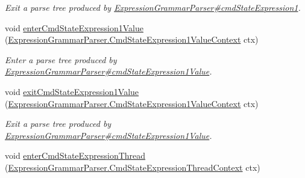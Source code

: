 \begin{DoxyCompactItemize}
\begin{DoxyCompactList}\small\item\em Exit a parse tree produced by \hyperlink{classgov_1_1nasa_1_1jpf_1_1inspector_1_1server_1_1expression_1_1parser_1_1_expression_grammar_parser_a1497794a3a59d8319803998a35dbb16e}{Expression\+Grammar\+Parser\#cmd\+State\+Expression1}. \end{DoxyCompactList}\item 
void \hyperlink{interfacegov_1_1nasa_1_1jpf_1_1inspector_1_1server_1_1expression_1_1parser_1_1_expression_grammar_listener_ae372522f6acd473c9201911f85256358}{enter\+Cmd\+State\+Expression1\+Value} (\hyperlink{classgov_1_1nasa_1_1jpf_1_1inspector_1_1server_1_1expression_1_1parser_1_1_expression_grammar_paacaa2424bb30d5b61478a2ac87dd697e}{Expression\+Grammar\+Parser.\+Cmd\+State\+Expression1\+Value\+Context} ctx)
\begin{DoxyCompactList}\small\item\em Enter a parse tree produced by \hyperlink{classgov_1_1nasa_1_1jpf_1_1inspector_1_1server_1_1expression_1_1parser_1_1_expression_grammar_parser_a3251ad238ec49a426731c88fd13886b1}{Expression\+Grammar\+Parser\#cmd\+State\+Expression1\+Value}. \end{DoxyCompactList}\item 
void \hyperlink{interfacegov_1_1nasa_1_1jpf_1_1inspector_1_1server_1_1expression_1_1parser_1_1_expression_grammar_listener_a8a57cc01401c52e1ef9a1432ba47031c}{exit\+Cmd\+State\+Expression1\+Value} (\hyperlink{classgov_1_1nasa_1_1jpf_1_1inspector_1_1server_1_1expression_1_1parser_1_1_expression_grammar_paacaa2424bb30d5b61478a2ac87dd697e}{Expression\+Grammar\+Parser.\+Cmd\+State\+Expression1\+Value\+Context} ctx)
\begin{DoxyCompactList}\small\item\em Exit a parse tree produced by \hyperlink{classgov_1_1nasa_1_1jpf_1_1inspector_1_1server_1_1expression_1_1parser_1_1_expression_grammar_parser_a3251ad238ec49a426731c88fd13886b1}{Expression\+Grammar\+Parser\#cmd\+State\+Expression1\+Value}. \end{DoxyCompactList}\item 
void \hyperlink{interfacegov_1_1nasa_1_1jpf_1_1inspector_1_1server_1_1expression_1_1parser_1_1_expression_grammar_listener_ac896def5ce7030bb35ce09b026038a4d}{enter\+Cmd\+State\+Expression\+Thread} (\hyperlink{classgov_1_1nasa_1_1jpf_1_1inspector_1_1server_1_1expression_1_1parser_1_1_expression_grammar_paf34f6c6cf6d3cef851c12971caa03ed5}{Expression\+Grammar\+Parser.\+Cmd\+State\+Expression\+Thread\+Context} ctx)

\end{DoxyCompactItemize}

